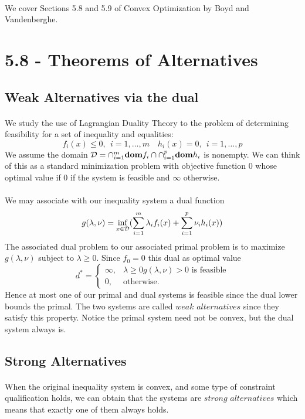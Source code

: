 \documentclass[letterpaper,12pt,oneside,onecolumn]{article}
\begin{document}
\paragraph{}
We cover Sections 5.8 and 5.9 of Convex Optimization by Boyd and Vandenberghe.
\section*{5.8 - Theorems of  Alternatives}
\subsection*{Weak Alternatives via the dual}
\paragraph{}
We study the use of Lagrangian Duality Theory to the problem of determining feasibility for a set of inequality and equalities:
$$f_i(x) \leq 0,\ \ i=1,\dots,m \quad h_i(x) = 0, \ \ i=1,\dots,p $$
We assume the domain $\mathcal{D} = \cap_{i=1}^m \textbf{dom} f_i \cap \cap_{i=1}^p \textbf{dom}h_i$ is nonempty. We can think of this as a standard minimization problem with objective function $0$ whose optimal value if $0$ if the system is feasible and $\infty$ otherwise.
\paragraph{}
We may associate with our inequality system a dual function
$$g(\lambda, \nu) = \inf_{x \in \mathcal{D}} (\sum_{i=1}^m \lambda_i f_i(x) + \sum_{i=1}^p \nu_i h_i(x))$$
The associated dual problem to our associated primal problem is to maximize $g(\lambda, \nu)$ subject to $\lambda \geq 0$. Since $f_0 = 0$ this dual as optimal value
$$ d^* = \begin{cases}
\infty, &\lambda \geq 0 g(\lambda,\nu) > 0 \text{ is feasible} \\
0, &\text{otherwise}.
\end{cases}
$$
Hence at most one of our primal and dual systems is feasible since the dual lower bounds the primal. The two systems are called $\textit{weak alternatives}$ since they satisfy this property. Notice the primal system need not be convex, but the dual system always is.
\subsection*{Strong Alternatives}
\paragraph{}
When the original inequality system is convex, and some type of constraint qualification holds, we can obtain that the systems are $\textit{strong alternatives}$ which means that exactly one of them always holds.
\end{document}
